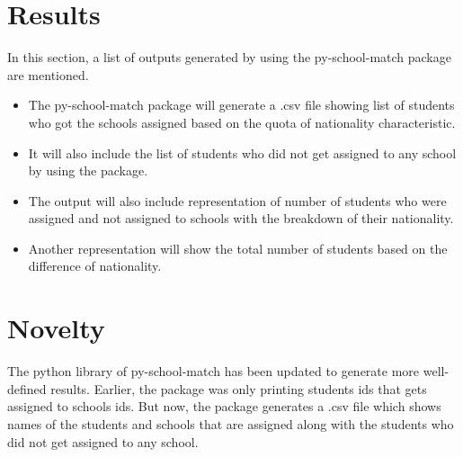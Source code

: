 \documentclass[twocolumn]{bmcart}
\begin{document}
	
	\section*{Results}
	\vspace{\baselineskip}
	In this section, a list of outputs generated by using the py-school-match package are mentioned.\vspace{\baselineskip}
	
	\begin{itemize}
		\vspace{-0.4cm}\item The py-school-match package will generate a .csv file showing list of students who got the schools assigned based on the quota of nationality characteristic. \vspace{\baselineskip}
		\vspace{-0.4cm}\item It will also include the list of students who did not get assigned to any school by using the package. \vspace{\baselineskip}
		\vspace{-0.4cm}\item The output will also include representation of number of students who were assigned and not assigned to schools with the breakdown of their nationality. \vspace{\baselineskip}
		\vspace{-0.4cm}\item Another representation will show the total number of students based on the difference of nationality. \vspace{\baselineskip}
	\end{itemize}
	
	\section*{Novelty}
	
	The python library of py-school-match has been updated to generate more well-defined results. Earlier, the package was only printing students ids that gets assigned to schools ids. But now, the package generates a .csv file which shows names of the students and schools that are assigned along with the students who did not get assigned to any school.
	
\end{document}
